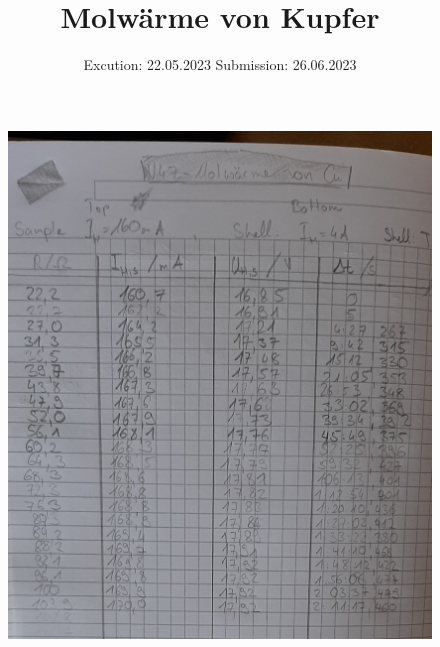 

\subject{V47}
\title{Molwärme von Kupfer}
\date{%
  Excution: 22.05.2023
  \hspace{3em}
  Submission: 26.06.2023
}



\maketitle
\thispagestyle{empty}
\tableofcontents
\newpage
\setcounter{page}{1}







\printbibliography{}
\begin{figure}
  \centering
  \includegraphics[width=\textwidth]{Messdaten/Messdaten.pdf}
\end{figure}

